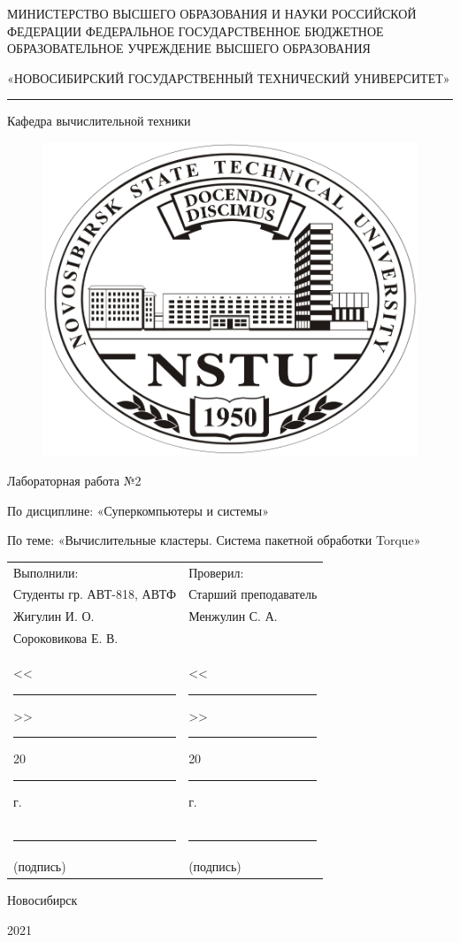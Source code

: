 \thispagestyle{empty}
\begin{center}

МИНИСТЕРСТВО ВЫСШЕГО ОБРАЗОВАНИЯ И НАУКИ РОССИЙСКОЙ ФЕДЕРАЦИИ
ФЕДЕРАЛЬНОЕ ГОСУДАРСТВЕННОЕ БЮДЖЕТНОЕ
ОБРАЗОВАТЕЛЬНОЕ УЧРЕЖДЕНИЕ
ВЫСШЕГО ОБРАЗОВАНИЯ

«НОВОСИБИРСКИЙ ГОСУДАРСТВЕННЫЙ ТЕХНИЧЕСКИЙ УНИВЕРСИТЕТ»

\noindent\rule{\textwidth}{0.4pt}

Кафедра вычислительной техники

\begin{figure}[H]
	\centering
	\includegraphics{title/logo.jpeg}
\end{figure}

Лабораторная работа №2

По дисциплине: «Суперкомпьютеры и системы»

По теме: «Вычислительные кластеры. Система пакетной обработки Torque»

\end{center}

\noindent\begin{tabular}{p{}p{}}
	Выполнили: & Проверил: \\
	Студенты гр. АВТ-818, АВТФ & Старший преподаватель\\
	Жигулин И. О. & Менжулин С. А. \\
	Сороковикова Е. В. & \\
	<<\rule{1.5em}{0.4pt}>> \rule{5em}{0.4pt} 20\rule{1.5em}{0.4pt}г. & <<\rule{1.5em}{0.4pt}>> \rule{5em}{0.4pt} 20\rule{1.5em}{0.4pt}г.\\
	\rule{7.5em}{0.4pt} & \rule{7.5em}{0.4pt} \\
	\hspace{1.5em}(подпись) & \hspace{1.5em}(подпись)
\end{tabular}


\begin{center}

\vspace{2.5cm}

Новосибирск

2021
\end{center}
